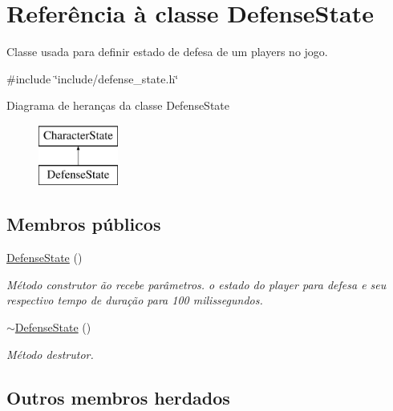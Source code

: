 \hypertarget{classDefenseState}{}\section{Referência à classe Defense\+State}
\label{classDefenseState}


Classe usada para definir estado de defesa de um players no jogo.  




{\ttfamily \#include \char`\"{}include/defense\+\_\+state.\+h\char`\"{}}

Diagrama de heranças da classe Defense\+State\begin{figure}[H]
\begin{center}
\leavevmode
\includegraphics[height=2.000000cm]{classDefenseState}
\end{center}
\end{figure}
\subsection*{Membros públicos}
\begin{DoxyCompactItemize}
\item 
\mbox{\label{classDefenseState_a196dcd342837ff786e97c7ac431b5131}} 
\mbox{\hyperlink{classDefenseState_a196dcd342837ff786e97c7ac431b5131}{Defense\+State}} ()
\begin{DoxyCompactList}\small\item\em Método construtor ão recebe parâmetros.  o estado do player para defesa e seu respectivo tempo de duração para 100 milissegundos. \end{DoxyCompactList}\item 
\mbox{\label{classDefenseState_a4ffd80270f04b3d45c0fd72144b56b49}} 
\mbox{\hyperlink{classDefenseState_a4ffd80270f04b3d45c0fd72144b56b49}{$\sim$\+Defense\+State}} ()
\begin{DoxyCompactList}\small\item\em Método destrutor. \end{DoxyCompactList}\end{DoxyCompactItemize}
\subsection*{Outros membros herdados}


